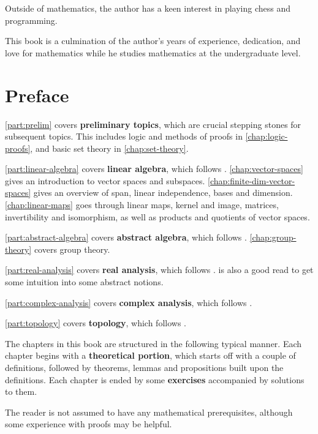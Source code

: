 Outside of mathematics, the author has a keen interest in playing chess and programming.

This book is a culmination of the author's years of experience, dedication, and love for mathematics while he studies mathematics at the undergraduate level.
\pagebreak

\section*{Preface}
\ifprelim
\cref{part:prelim} covers \textbf{preliminary topics}, which are crucial stepping stones for subsequent topics. This includes logic and methods of proofs in \cref{chap:logic-proofs}, and basic set theory in \cref{chap:set-theory}.
\else
\fi

\iflinalg
\cref{part:linear-algebra} covers \textbf{linear algebra}, which follows \cite{axler}. \cref{chap:vector-spaces} gives an introduction to vector spaces and subspaces. \cref{chap:finite-dim-vector-spaces} gives an overview of span, linear independence, bases and dimension. \cref{chap:linear-maps} goes through linear maps, kernel and image, matrices, invertibility and isomorphism, as well as products and quotients of vector spaces.
\else
\fi

\ifabsalg
\cref{part:abstract-algebra} covers \textbf{abstract algebra}, which follows \cite{dummit-foote,artin}. \cref{chap:group-theory} covers group theory.
\else
\fi

\ifranalysis
\cref{part:real-analysis} covers \textbf{real analysis}, which follows \cite{rudin,apostol,bartle-sherbert}. \cite{alcock} is also a good read to get some intuition into some abstract notions.
\else
\fi

\ifcanalysis
\cref{part:complex-analysis} covers \textbf{complex analysis}, which follows \cite{ahlfors,lang}.
\else
\fi

\iftop
\cref{part:topology} covers \textbf{topology}, which follows \cite{munkres}.
\else
\fi


The chapters in this book are structured in the following typical manner. Each chapter begins with a \textbf{theoretical portion}, which starts off with a couple of definitions, followed by theorems, lemmas and propositions built upon the definitions. Each chapter is ended by some \textbf{exercises} accompanied by solutions to them.

The reader is not assumed to have any mathematical prerequisites, although some experience with proofs may be helpful.

